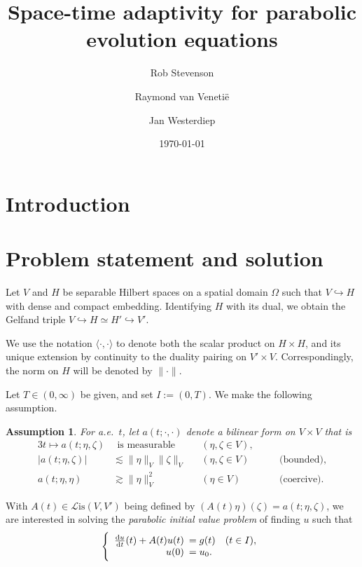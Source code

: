 \documentclass[11pt,a4paper,oneside,english]{amsart}
\title{Space-time adaptivity for parabolic evolution equations}
\author{Rob Stevenson \and Raymond van Veneti\"e \and Jan Westerdiep}
\date{\today}
\numberwithin{equation}{section}
\numberwithin{theorem}{section}
\newtheorem{assum}[theorem]{Assumption}
\theoremstyle{definition}
\newcommand{\la}{\langle}
\newcommand{\ra}{\rangle}
\newcommand{\cL}{\mathcal L}
\newcommand{\Lis}{\cL\mathrm{is}}
\begin{document}
\begin{abstract}
\end{abstract}

\maketitle

\section{Introduction}
\section{Problem statement and solution}
Let $V$ and $H$ be separable Hilbert spaces on a spatial domain $\Omega$ such that
$V \hookrightarrow H$ with dense and compact embedding. Identifying $H$ with its
dual, we obtain the Gelfand triple $V \hookrightarrow H \simeq H' \hookrightarrow V'$.

We use the notation $\la \cdot,\cdot \ra$ to denote both the scalar product
on $H \times H$, and its unique extension by continuity to the duality pairing on
$V' \times V$. Correspondingly, the norm on $H$ will be denoted by $\|\cdot\|$.

Let $T \in (0, \infty)$ be given, and set $I := (0, T)$. We make the following assumption.
\begin{assum}
  \label{assum:a}
  For a.e.~$t$, let $a(t;\cdot,\cdot)$ denote a bilinear form on $V \times V$ that is
  \begin{alignat*}{3}
    t \mapsto a(t; \eta, \zeta) & ~~ \text{is measurable} \quad && (\eta, \zeta \in V), \\
    |a(t;\eta,\zeta)| & \lesssim  \|\eta\|_{V} \|\zeta\|_{V} &&(\eta,\zeta \in V) &\quad&\text{(bounded)}, \\
     a(t;\eta,\eta)   & \gtrsim   \|\eta\|_{V}^2 &&(\eta \in {V}) &&\text{(coercive)}.
  \end{alignat*}
\end{assum}

With $A(t) \in \Lis({V},V')$ being defined by $ (A(t) \eta)(\zeta)=a(t;\eta,\zeta)$,
we are interested in solving the {\em parabolic initial value problem} of finding
$u$ such that
\begin{equation}
  \label{eqn:ibvp}
  \left\{
    \begin{array}{rl} 
      \frac{\dif u}{\dif t}(t) +A(t) u(t)&\!\!\!= g(t) \quad(t \in I),\\
      u(0) &\!\!\!= u_0.
    \end{array}
  \right.
\end{equation}
\end{document}
